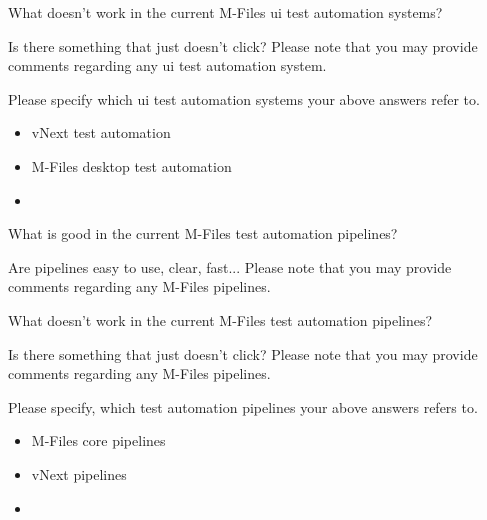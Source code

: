 \begin{question}[resume]
\begin{surveydescription}
	\end{surveydescription}
	\longtextfield
	\item What doesn't work in the current M-Files \gls{ui} test automation systems?\greencheckmark\\
	\begin{surveydescription}
		Is there something that just doesn't click? Please note that you may provide comments regarding any \gls{ui} test automation system.
	\end{surveydescription}
	\longtextfield
	\item Please specify which \gls{ui} test automation systems your above answers refer to.\greencheckmark
	\begin{itemize}[noitemsep, leftmargin=1.5em]
		\renewcommand\labelitemi{$\square$}
		\item vNext test automation
		\item M-Files desktop test automation
		\item \othertextfield
	\end{itemize}
	\item What is good in the current M-Files test automation pipelines?\greencheckmark\label{survey_question:good_in_pipelines}\\
	\begin{surveydescription}
		Are pipelines easy to use, clear, fast... Please note that you may provide comments regarding any M-Files pipelines.
	\end{surveydescription}
	\longtextfield
	\item What doesn't work in the current M-Files test automation pipelines?\greencheckmark\\
	\begin{surveydescription}
		Is there something that just doesn't click? Please note that you may provide comments regarding any M-Files pipelines.
	\end{surveydescription}
	\longtextfield
	\item Please specify, which test automation pipelines your above answers refers to.\greencheckmark
	\begin{itemize}[noitemsep, leftmargin=1.5em]
		\renewcommand\labelitemi{$\square$}
		\item M-Files core pipelines
		\item vNext pipelines
		\item \othertextfield
	\end{itemize}
\end{question}

